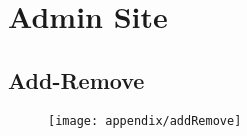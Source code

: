 \chapter{Admin Site}
\section{Add-Remove}\label{app:addremove}
\begin{figure}[h]
	\centering
	\texttt{[image: appendix/addRemove]}
\end{figure}

